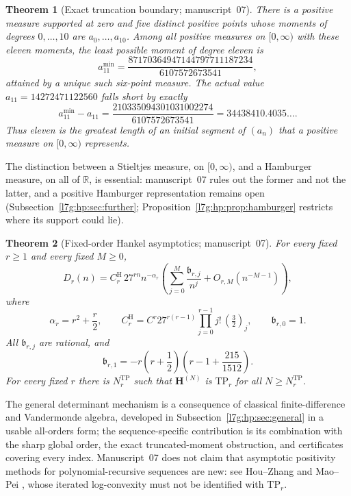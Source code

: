 \documentclass[11pt,letterpaper]{article}
\newtheorem{theorem}{Theorem}[section]
\theoremstyle{remark}\newtheorem{remark}[theorem]{Remark}
\newcommand{\TP}{\mathrm{TP}}\newcommand{\TN}{\mathrm{TN}}
\newcounter{l7gtrsavedeq}
\begin{document}
\begin{theorem}[Exact truncation boundary; manuscript~07]\label{l7g:hp:thm:moment}
There is a positive measure supported at zero and five distinct positive
points whose moments of degrees $0,\dots,10$ are $a_0,\dots,a_{10}$. Among
all positive measures on $[0,\infty)$ with these eleven moments, the least
possible moment of degree eleven is
\begin{equation}\label{l7g:hp:eq:c11min}
 a_{11}^{\min}=\frac{87170364947144797711187234}{6107572673541},
\end{equation}
attained by a unique such six-point measure. The actual value
$a_{11}=14272471122560$ falls short by exactly
\begin{equation}\label{l7g:hp:eq:repair}
 a_{11}^{\min}-a_{11}=\frac{210335094301031002274}{6107572673541}
 =34438410.4035\ldots.
\end{equation}
Thus eleven is the greatest length of an initial segment of $(a_n)$ that a
positive measure on $[0,\infty)$ represents.
\end{theorem}
The distinction between a Stieltjes measure, on $[0,\infty)$, and a
Hamburger measure, on all of $\mathbb R$, is essential: manuscript~07 rules
out the former and not the latter, and a positive Hamburger representation
remains open (Subsection~\ref{l7g:hp:sec:further};
Proposition~\ref{l7g:hp:prop:hamburger} restricts where its support could
lie).

\begin{theorem}[Fixed-order Hankel asymptotics; manuscript~07]\label{l7g:hp:thm:hankelmain}
For every fixed $r\ge1$ and every fixed $M\ge0$,
\begin{equation}\label{l7g:hp:eq:mainexpansion}
 D_r(n)=C^{\mathrm H}_r\,27^{rn}n^{-\alpha_r}
 \left(\sum_{j=0}^{M}\frac{\mathfrak b_{r,j}}{n^j}
       +O_{r,M}(n^{-M-1})\right),
\end{equation}
where
\begin{equation}\label{l7g:hp:eq:Ar}
 \alpha_r=r^2+\frac r2,\qquad
 C^{\mathrm H}_r=C^r27^{r(r-1)}\prod_{j=0}^{r-1}j!\,(\tfrac32)_j,
 \qquad \mathfrak b_{r,0}=1.
\end{equation}
All $\mathfrak b_{r,j}$ are rational, and
\begin{equation}\label{l7g:hp:eq:beta1main}
 \mathfrak b_{r,1}=-r\left(r+\frac12\right)
 \left(r-1+\frac{215}{1512}\right).
\end{equation}
For every fixed $r$ there is $N^{\TP}_r$ such that $\mathbf H^{(N)}$ is
$\TP_r$ for all $N\ge N^{\TP}_r$.
\end{theorem}
The general determinant mechanism is a consequence of classical
finite-difference and Vandermonde algebra, developed in
Subsection~\ref{l7g:hp:sec:general} in a usable all-orders form; the
sequence-specific contribution is its combination with the sharp global
order, the exact truncated-moment obstruction, and certificates covering
every index. Manuscript~07 does not claim that asymptotic positivity
methods for polynomial-recursive sequences are new: see Hou--Zhang
\cite{l7g:hp:houzhang} and Mao--Pei \cite{l7g:hp:maopei}, whose iterated
log-convexity must not be identified with $\TP_r$.
\end{document}
